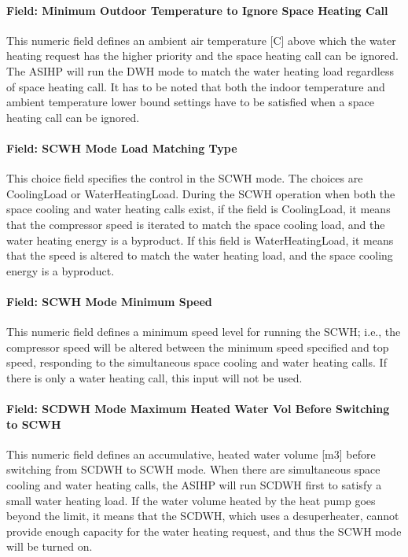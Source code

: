 \paragraph{Field: Minimum Outdoor Temperature to Ignore Space Heating Call}\label{Field-Minimum-Outdoor-IgnoreSH-ASIHP}

This numeric field defines an ambient air temperature [C] above which the water heating request has the higher priority and the space heating call can be ignored. The ASIHP will run the DWH mode to match the water heating load regardless of space heating call. It has to be noted that both the indoor temperature and ambient temperature lower bound settings have to be satisfied when a space heating call can be ignored.


\paragraph{Field: SCWH Mode Load Matching Type}\label{Field-SCWH-Matching-Type-ASIHP}

This choice field specifies the control in the SCWH mode. The choices are CoolingLoad or WaterHeatingLoad. During the SCWH operation when both the space cooling and water heating calls exist, if the field is CoolingLoad, it means that the compressor speed is iterated to match the space cooling load, and the water heating energy is a byproduct.  If this field is WaterHeatingLoad, it means that the speed is altered to match the water heating load, and the space cooling energy is a byproduct.



\paragraph{Field: SCWH Mode Minimum Speed}\label{Field-SCWH-Minimum-Speed-ASIHP}

This numeric field defines a minimum speed level for running the SCWH; i.e., the compressor speed will be altered between the minimum speed specified and top speed, responding to the simultaneous space cooling and water heating calls. If there is only a water heating call, this input will not be used.

\paragraph{Field: SCDWH Mode Maximum Heated Water Vol Before Switching to SCWH}\label{Field-SCDWH-Max-Water-ASIHP}

This numeric field defines an accumulative, heated water volume [m3] before switching from SCDWH to SCWH mode. When there are simultaneous space cooling and water heating calls, the ASIHP will run SCDWH first to satisfy a small water heating load. If the water volume heated by the heat pump goes beyond the limit, it means that the SCDWH, which uses a desuperheater, cannot provide enough capacity for the water heating request, and thus the SCWH mode will be turned on.




